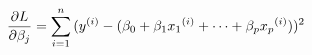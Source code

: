\documentclass[preview]{standalone}
\begin{document}
\begin{align*}
{\special{dvisvgm:raw <g id='unique000'>}\frac{\partial L}{\partial \beta_j}=\sum_{i=1}^n{(y^{(i)}-(\beta_0+\beta_1 {x_1}^{(i)}+\dots+\beta_p {x_p}^{(i)}}))^2}\special{dvisvgm:raw </g>}
\end{align*}
\end{document}
